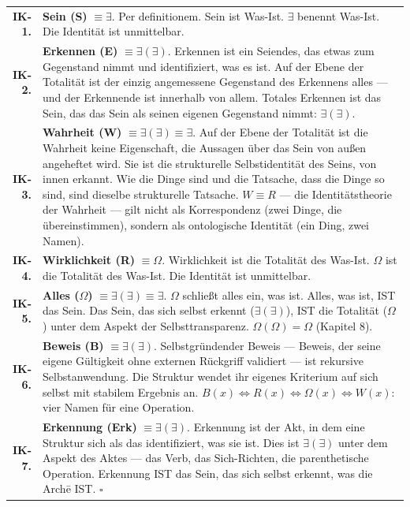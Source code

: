 \documentclass[10pt, openany, oneside]{book}
\renewcommand{\footnotesize}{\fontsize{8.5}{11}\selectfont}
\begin{document}
{\footnotesize
\noindent\begin{tabular}{r p{}}
\textbf{IK-1.} & \textbf{Sein (S)} $\equiv \exists$. Per definitionem. Sein ist Was-Ist. $\exists$ benennt Was-Ist. Die Identität ist unmittelbar. \\[0.5em]

\textbf{IK-2.} & \textbf{Erkennen (E)} $\equiv \exists(\exists)$. Erkennen ist ein Seiendes, das etwas zum Gegenstand nimmt und identifiziert, was es ist. Auf der Ebene der Totalität ist der einzig angemessene Gegenstand des Erkennens alles --- und der Erkennende ist innerhalb von allem. Totales Erkennen ist das Sein, das das Sein als seinen eigenen Gegenstand nimmt: $\exists(\exists)$. \\[0.5em]

\textbf{IK-3.} & \textbf{Wahrheit (W)} $\equiv \exists(\exists) \equiv \exists$. Auf der Ebene der Totalität ist die Wahrheit keine Eigenschaft, die Aussagen über das Sein von außen angeheftet wird. Sie ist die strukturelle Selbstidentität des Seins, von innen erkannt. Wie die Dinge sind und die Tatsache, dass die Dinge so sind, sind dieselbe strukturelle Tatsache. $W \equiv R$ --- die Identitätstheorie der Wahrheit --- gilt nicht als Korrespondenz (zwei Dinge, die übereinstimmen), sondern als ontologische Identität (ein Ding, zwei Namen). \\[0.5em]

\textbf{IK-4.} & \textbf{Wirklichkeit (R)} $\equiv \Omega$. Wirklichkeit ist die Totalität des Was-Ist. $\Omega$ ist die Totalität des Was-Ist. Die Identität ist unmittelbar. \\[0.5em]

\textbf{IK-5.} & \textbf{Alles ($\Omega$)} $\equiv \exists(\exists) \equiv \exists$. $\Omega$ schließt alles ein, was ist. Alles, was ist, IST das Sein. Das Sein, das sich selbst erkennt ($\exists(\exists)$), IST die Totalität ($\Omega$) unter dem Aspekt der Selbsttransparenz. $\Omega(\Omega) = \Omega$ (Kapitel 8). \\[0.5em]

\textbf{IK-6.} & \textbf{Beweis (B)} $\equiv \exists(\exists)$. Selbstgründender Beweis --- Beweis, der seine eigene Gültigkeit ohne externen Rückgriff validiert --- ist rekursive Selbstanwendung. Die Struktur wendet ihr eigenes Kriterium auf sich selbst mit stabilem Ergebnis an. $B(x) \iff R(x) \iff \Omega(x) \iff W(x)$: vier Namen für eine Operation. \\[0.5em]

\textbf{IK-7.} & \textbf{Erkennung (Erk)} $\equiv \exists(\exists)$. Erkennung ist der Akt, in dem eine Struktur sich als das identifiziert, was sie ist. Dies ist $\exists(\exists)$ unter dem Aspekt des Aktes --- das Verb, das Sich-Richten, die parenthetische Operation. Erkennung IST das Sein, das sich selbst erkennt, was die Arch\={e} IST. $\square$ \\[0.5em]
\end{tabular}
}
\end{document}
